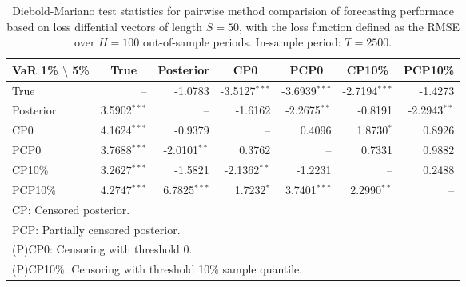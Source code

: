 { \renewcommand{\arraystretch}{1.2} 
\begin{table} 
\center 
\begin{tabular}{l | rrr rrr} 
VaR 1\% $\setminus$ 5\% & \multicolumn{1}{c}{True} & \multicolumn{1}{c}{Posterior} & \multicolumn{1}{c}{CP0} & \multicolumn{1}{c}{PCP0} & \multicolumn{1}{c}{CP10\%} & \multicolumn{1}{c}{PCP10\%} \\ \hline 
True &    --\phantom{$^{***}$} & -1.0783\phantom{$^{***}$} & -3.5127$^{***}$ & -3.6939$^{***}$ & -2.7194$^{***}$ & -1.4273\phantom{$^{***}$}  \\ 
Posterior & 3.5902$^{***}$ &    --\phantom{$^{***}$} & -1.6162\phantom{$^{***}$} & -2.2675$^{**}$\phantom{$^{*}$} & -0.8191\phantom{$^{***}$} & -2.2943$^{**}$\phantom{$^{*}$}  \\ 
CP0 & 4.1624$^{***}$ & -0.9379\phantom{$^{***}$} &    --\phantom{$^{***}$} & 0.4096\phantom{$^{***}$} & 1.8730$^{*}$\phantom{$^{**}$} & 0.8926\phantom{$^{***}$}  \\ 
PCP0 & 3.7688$^{***}$ & -2.0101$^{**}$\phantom{$^{*}$} & 0.3762\phantom{$^{***}$} &    --\phantom{$^{***}$} & 0.7331\phantom{$^{***}$} & 0.9882\phantom{$^{***}$}  \\ 
CP10\% & 3.2627$^{***}$ & -1.5821\phantom{$^{***}$} & -2.1362$^{**}$\phantom{$^{*}$} & -1.2231\phantom{$^{***}$} &    --\phantom{$^{***}$} & 0.2488\phantom{$^{***}$}  \\ 
PCP10\% & 4.2747$^{***}$ & 6.7825$^{***}$ & 1.7232$^{*}$\phantom{$^{**}$} & 3.7401$^{***}$ & 2.2990$^{**}$\phantom{$^{*}$} &    --\phantom{$^{***}$}  \\ 
\hline 
\multicolumn{7}{l}{\footnotesize{CP: Censored posterior.}}  \\ 
\multicolumn{7}{l}{\footnotesize{PCP: Partially censored posterior.}} \\ 
\multicolumn{7}{l}{\footnotesize{(P)CP0: Censoring with threshold 0.}} \\ 
\multicolumn{7}{l}{\footnotesize{(P)CP10\%: Censoring with threshold 10\% sample quantile.}}  \\ 
\end{tabular}
 \caption{Diebold-Mariano test statistics for  pairwise method comparision of forecasting performace based on loss diffential vectors of length $S = 50$, with the loss function defined as the RMSE over $H=100$ out-of-sample periods. In-sample period: $T = 2500$.} 
\label{tab:garch11_v2_DM_T_2500}  
\end{table}
}